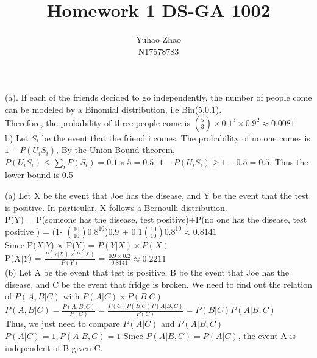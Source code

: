 \documentclass[12pt]{article}
\newenvironment{problem}[2][Problem]{\begin{trivlist}
\item[\hskip \labelsep {\bfseries #1}\hskip \labelsep {\bfseries #2.}]}{\end{trivlist}}
\begin{document}
 
 
\title{Homework 1 DS-GA 1002 }%
\author{Yuhao Zhao\\ %
N17578783} %
 
\maketitle
 
\begin{problem}{1} 
\end{problem}
(a). If each of the friends decided to go independently, the number of people come can be modeled by a Binomial distribution, i.e Bin(5,0.1).\\
Therefore, the probability of three people come is ${5 \choose 3} \times 0.1^3 \times 0.9^2 \approx 0.0081$ 
\\

b) Let $S_i $ be the event that the friend i comes. The probability of no one comes is $1- P(U_iS_i)$, By the Union Bound theorem, $P(U_iS_i)  \leq \sum_{i }^{} P(S_i) = 0.1\times 5 = 0.5$, $1- P(U_iS_i) \geq 1-0.5 = 0.5$. Thus the lower bound is 0.5
 

\begin{problem}{2}
\end{problem}
(a) Let X be the event that Joe has the disease, and Y be the event that the test is positive. In particular, X follows a Bernoulli distribution.\\
P(Y) = P(someone has the disease, test positive)+P(no one has the disease, test positive )
		= (1- ${10 \choose 10} 0.8^{10}$)0.9 + 0.1${10 \choose 10}0.8^{10} \approx 0.8141$\\
Since P($X|Y$) $\times$ P(Y) = $P(Y|X) \times P(X)$\\
 P($X|Y$) = $\frac{P(Y|X) \times P(X)}{P(Y)}$ = $\frac{0.9 \times 0.2}{0.8141} \approx  0.2211$ \\
 
(b) Let A be the event that test is positive, B be the event that Joe has the disease, and C be the event that fridge is broken. We need to find out the relation of $P(A,B|C)$ with $P(A|C) \times P(B|C)$\\
$P(A,B|C) = \frac{P(A,B,C)}{P(C)} = \frac{P(C)P(B|C)P(A|B,C)}{P(C)}  = P(B|C)P(A|B,C)$\\
Thus, we just need to compare $P(A|C)$ and $P(A|B,C)$
$P(A|C) = 1 , P(A|B,C) = 1$
Since $P(A|B,C) = P(A|C)$, the event A is independent of B given C.\\
\end{document}
